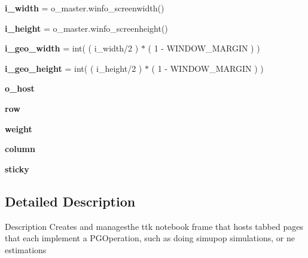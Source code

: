 \begin{DoxyCompactItemize}
\item 
{\bfseries i\+\_\+width} = o\+\_\+master.\+winfo\+\_\+screenwidth()\hypertarget{namespacenegui_1_1pghostnotebook_abb662bea4c9bf9d4a5fe42c4fb4b4ed6}{}\label{namespacenegui_1_1pghostnotebook_abb662bea4c9bf9d4a5fe42c4fb4b4ed6}

\item 
{\bfseries i\+\_\+height} = o\+\_\+master.\+winfo\+\_\+screenheight()\hypertarget{namespacenegui_1_1pghostnotebook_abfedf6f0e0f6f989eba30fd49babff1d}{}\label{namespacenegui_1_1pghostnotebook_abfedf6f0e0f6f989eba30fd49babff1d}

\item 
{\bfseries i\+\_\+geo\+\_\+width} = int( ( i\+\_\+width/2 ) $\ast$ ( 1 -\/ W\+I\+N\+D\+O\+W\+\_\+\+M\+A\+R\+G\+IN ) )\hypertarget{namespacenegui_1_1pghostnotebook_a999255d83a1b5a0fa4eb9637eed7a597}{}\label{namespacenegui_1_1pghostnotebook_a999255d83a1b5a0fa4eb9637eed7a597}

\item 
{\bfseries i\+\_\+geo\+\_\+height} = int( ( i\+\_\+height/2 ) $\ast$ ( 1 -\/ W\+I\+N\+D\+O\+W\+\_\+\+M\+A\+R\+G\+IN ) )\hypertarget{namespacenegui_1_1pghostnotebook_a3f20501fe15d8b5209094a4faea61d0c}{}\label{namespacenegui_1_1pghostnotebook_a3f20501fe15d8b5209094a4faea61d0c}

\item 
{\bfseries o\+\_\+host}
\item 
{\bfseries row}\hypertarget{namespacenegui_1_1pghostnotebook_abbdb0eca27e7301cb04d4e404a1325e5}{}\label{namespacenegui_1_1pghostnotebook_abbdb0eca27e7301cb04d4e404a1325e5}

\item 
{\bfseries weight}\hypertarget{namespacenegui_1_1pghostnotebook_ad128d121aeac1b79c3f0f86d1fd8131c}{}\label{namespacenegui_1_1pghostnotebook_ad128d121aeac1b79c3f0f86d1fd8131c}

\item 
{\bfseries column}\hypertarget{namespacenegui_1_1pghostnotebook_a6c203ea581355857a12fad081c23c08a}{}\label{namespacenegui_1_1pghostnotebook_a6c203ea581355857a12fad081c23c08a}

\item 
{\bfseries sticky}\hypertarget{namespacenegui_1_1pghostnotebook_a5b7b1e279a09dd3ad592ac50862c7886}{}\label{namespacenegui_1_1pghostnotebook_a5b7b1e279a09dd3ad592ac50862c7886}

\end{DoxyCompactItemize}


\subsection{Detailed Description}
\begin{DoxyVerb}Description
Creates and managesthe ttk notebook frame
that hosts tabbed pages that each implement 
a PGOperation, such as doing simupop simulations,
or ne estimations
\end{DoxyVerb}
 


